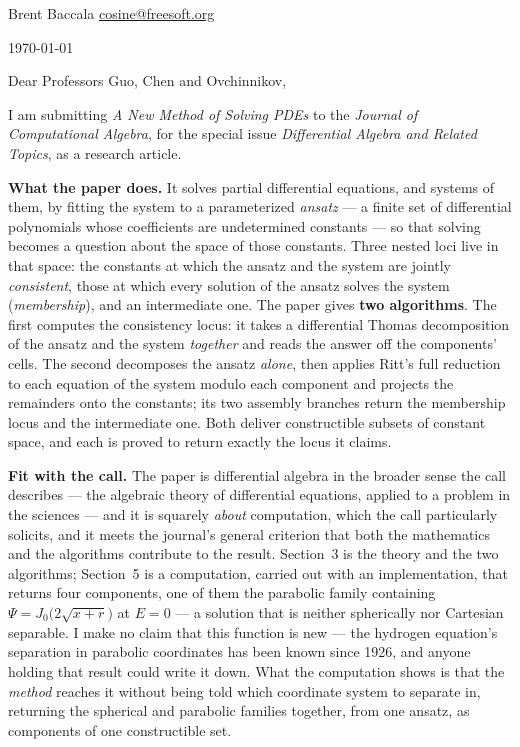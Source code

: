 \documentclass[11pt]{article}
\begin{document}
\enlargethispage{12\baselineskip}

\hfill Brent Baccala \quad \url{cosine@freesoft.org}

\hfill \today

\vspace{6pt}

Dear Professors Guo, Chen and Ovchinnikov,

I am submitting {\it A New Method of Solving PDEs} to the {\it Journal of
Computational Algebra}, for the special issue {\it Differential Algebra and
Related Topics}, as a research article.

{\bf What the paper does.}  It solves partial differential equations, and
systems of them, by fitting the system to a parameterized {\it ansatz} --- a
finite set of differential polynomials whose coefficients are undetermined
constants --- so that solving becomes a question about the space of those
constants.  Three nested loci live in that space: the constants at which the
ansatz and the system are jointly {\it consistent}, those at which every
solution of the ansatz solves the system ({\it membership}), and an intermediate
one.  The paper gives {\bf two algorithms}.  The first computes the consistency
locus: it takes a differential Thomas decomposition of the ansatz and the system
{\it together} and reads the answer off the components' cells.  The second
decomposes the ansatz {\it alone}, then applies Ritt's full reduction to each
equation of the system modulo each component and projects the remainders onto
the constants; its two assembly branches return the membership locus and the
intermediate one.  Both deliver constructible subsets of constant space, and
each is proved to return exactly the locus it claims.

{\bf Fit with the call.}  The paper is differential algebra in the broader
sense the call describes --- the algebraic theory of differential equations,
applied to a problem in the sciences --- and it is squarely {\it about}
computation, which the call particularly solicits, and it meets the journal's
general criterion that both the mathematics and the algorithms contribute to the
result.  Section~3 is the theory and the two algorithms; Section~5 is a
computation, carried out with an implementation, that returns four components,
one of them the parabolic family containing
$\Psi = J_0\bigl(2\sqrt{x+r}\bigr)$ at $E=0$ --- a solution that is neither
spherically nor Cartesian separable.  I make no claim that this function is new
--- the hydrogen equation's separation in parabolic coordinates has been known
since 1926, and anyone holding that result could write it down.  What the
computation shows is that the {\it method} reaches it without being told which
coordinate system to separate in, returning the spherical and parabolic families
together, from one ansatz, as components of one constructible set.
\end{document}
